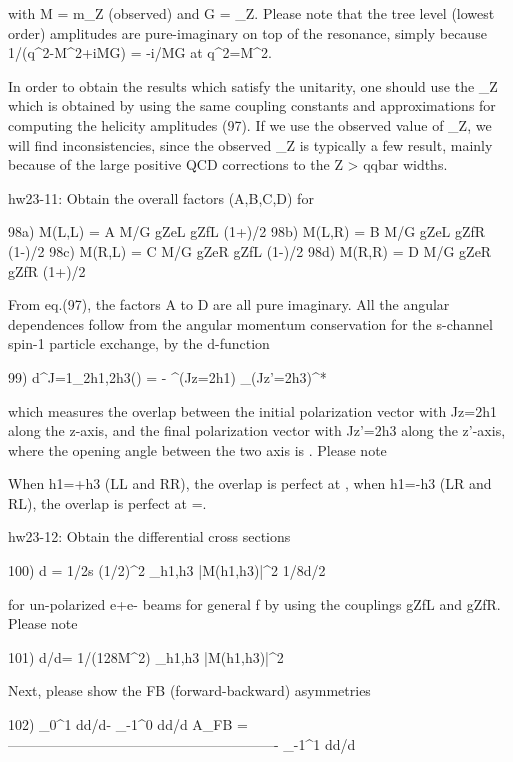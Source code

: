 \documentclass[12pt]{article}
\def\eps{\epsilon}
\def\th{\theta}
\begin{document}
  with M = m_Z (observed) and G = \Gamma_Z.  Please note that the tree
  level (lowest order) amplitudes are pure-imaginary on top of the
  resonance, simply because 1/(q^2-M^2+iMG) = -i/MG at q^2=M^2.

  In order to obtain the results which satisfy the unitarity, one should
  use the \Gamma_Z which is obtained by using the same coupling constants
  and approximations for computing the helicity amplitudes (97).  If we
  use the observed value of \Gamma_Z, we will find inconsistencies, since
  the observed \Gamma_Z is typically a few %
  result, mainly because of the large positive QCD corrections to
  the Z > qqbar widths.

hw23-11: Obtain the overall factors (A,B,C,D) for

  98a) M(L,L) = A M/G gZeL gZfL (1+\cth)/2
  98b) M(L,R) = B M/G gZeL gZfR (1-\cth)/2
  98c) M(R,L) = C M/G gZeR gZfL (1-\cth)/2
  98d) M(R,R) = D M/G gZeR gZfR (1+\cth)/2

  From eq.(97), the factors A to D are all pure imaginary.  All the
  angular dependences follow from the angular momentum conservation for
  the s-channel spin-1 particle exchange, by the d-function

  99)
  d^{J=1}_{2h1,2h3}(\th) = - \eps^\mu(Jz=2h1) \eps_\mu(Jz'=2h3)^*

  which measures the overlap between the initial polarization vector with
  Jz=2h1 along the z-axis, and the final polarization vector with Jz'=2h3
  along the z'-axis, where the opening angle between the two axis is
  \theta.  Please note

  When h1=+h3 (LL and RR), the overlap is perfect at ,
  when h1=-h3 (LR and RL), the overlap is perfect at \theta=\pi.

hw23-12: Obtain the differential cross sections

  100) d\sigma
  = 1/2s (1/2)^2 \Sum_{h1,h3} |M(h1,h3)|^2 1/8\pi d\cth/2

  for un-polarized e+e- beams for general f by using the
  couplings gZfL and gZfR.  Please note

  101)
  d\sigma/d\cth = 1/(128\pi M^2) \Sum_{h1,h3} |M(h1,h3)|^2

  Next, please show the FB (forward-backward) asymmetries

  102)   \Int_0^1 d\cth d\sig/d\cth - \Int_{-1}^0 d\cth d\sig/d\cth
  A_FB = ----------------------------------------------------------
         \Int_{-1}^1 d\cth d\sig/d\cth
\end{document}
